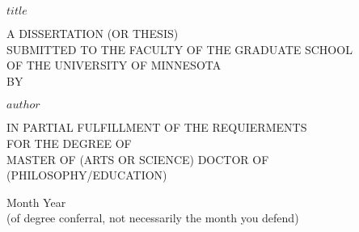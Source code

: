 %
%
%
% 

\begin{center}
     \vspace*{1cm}
         
     \Huge
     \textbf{$title$}
         
     \vspace{1.5cm}
     \vfill
     \large
     A DISSERTATION (OR THESIS)\\
     SUBMITTED TO THE FACULTY OF THE GRADUATE SCHOOL\\
     OF THE UNIVERSITY OF MINNESOTA\\
     BY
         
     \textbf{$author$}
     
     \vfill
     
     IN PARTIAL FULFILLMENT OF THE REQUIERMENTS\\
     FOR THE DEGREE OF\\
     MASTER OF (ARTS OR SCIENCE) DOCTOR OF (PHILOSOPHY/EDUCATION)
         
     \vfill
         
     \vspace{0.8cm}
         
     \Large
     \text{$$}
     
     \vspace{0.8cm}
     
     Month Year\\ 
     (of degree conferral, not necessarily the month you defend) 
 \end{center}

 
 